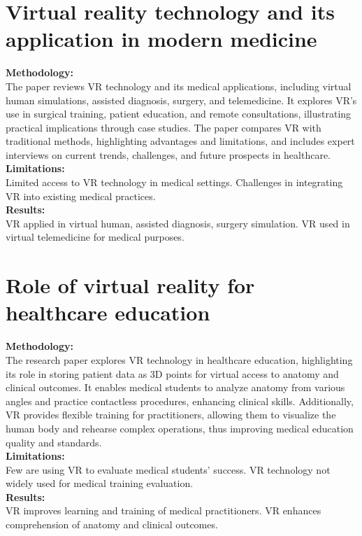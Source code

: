\section{Virtual reality technology and its application in modern medicine
\cite{JournalArticle}}
\textbf{Methodology:}\\The paper reviews VR technology and its medical applications, including virtual human simulations, assisted diagnosis, surgery, and telemedicine. It explores VR's use in surgical training, patient education, and remote consultations, illustrating practical implications through case studies. The paper compares VR with traditional methods, highlighting advantages and limitations, and includes expert interviews on current trends, challenges, and future prospects in healthcare.\\
\textbf{Limitations:}\\Limited access to VR technology in medical settings. Challenges in integrating VR into existing medical practices.\\
\textbf{Results:}\\ VR applied in virtual human, assisted diagnosis, surgery simulation. VR used in virtual telemedicine for medical purposes.
\section{Role of virtual reality for healthcare education
\cite{BookChapter}}
\textbf{Methodology:}\\The research paper explores VR technology in healthcare education, highlighting its role in storing patient data as 3D points for virtual access to anatomy and clinical outcomes. It enables medical students to analyze anatomy from various angles and practice contactless procedures, enhancing clinical skills. Additionally, VR provides flexible training for practitioners, allowing them to visualize the human body and rehearse complex operations, thus improving medical education quality and standards.\\
\textbf{Limitations:}\\
Few are using VR to evaluate medical students' success. VR technology not widely used for medical training evaluation.\\
\textbf{Results:}\\ VR improves learning and training of medical practitioners.
VR enhances comprehension of anatomy and clinical outcomes.
